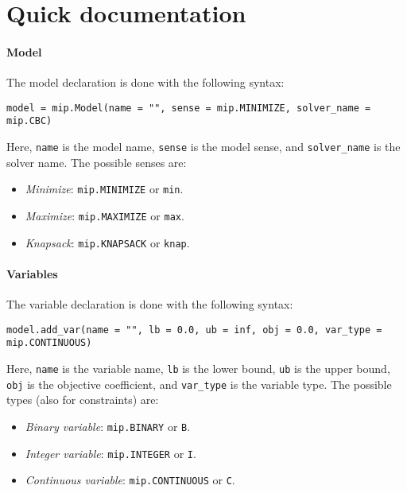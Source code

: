 \section{Quick documentation}

\paragraph*{Model}
The model declaration is done with the following syntax: 
\begin{lstlisting}[style=Python]
model = mip.Model(name = "", sense = mip.MINIMIZE, solver_name = mip.CBC)
\end{lstlisting}
Here, \texttt{name} is the model name, \texttt{sense} is the model sense, and \texttt{solver\_name} is the solver name. 
The possible senses are: 
\begin{itemize}
  \item \textit{Minimize}: \texttt{mip.MINIMIZE} or \texttt{min}.
  \item \textit{Maximize}: \texttt{mip.MAXIMIZE} or \texttt{max}.
  \item \textit{Knapsack}: \texttt{mip.KNAPSACK} or \texttt{knap}.
\end{itemize}

\paragraph*{Variables}
The variable declaration is done with the following syntax: 
\begin{lstlisting}[style=Python]
model.add_var(name = "", lb = 0.0, ub = inf, obj = 0.0, var_type = mip.CONTINUOUS)
\end{lstlisting}
Here, \texttt{name} is the variable name, \texttt{lb} is the lower bound, \texttt{ub} is the upper bound, \texttt{obj} is the objective coefficient, and \texttt{var\_type} is the variable type.
The possible types (also for constraints) are: 
\begin{itemize}
    \item \textit{Binary variable}: \texttt{mip.BINARY} or \texttt{B}.
    \item \textit{Integer variable}: \texttt{mip.INTEGER} or \texttt{I}.
    \item \textit{Continuous variable}: \texttt{mip.CONTINUOUS} or \texttt{C}.
\end{itemize}

